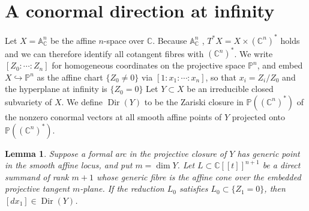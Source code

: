 \documentclass[11pt]{amsart}
\numberwithin{equation}{section}
\newtheorem{lemma}[theorem]{Lemma}
\theoremstyle{plain}
\theoremstyle{remark}
\begin{document}
\section{A conormal direction at infinity}\label{sec:conormal-review}
Let $X=\mathbb A^n_{\mathbb C}$ be the affine $n$-space over $\mathbb{C}$. Because $\mathbb A^n_{\mathbb C}$ , $T^*X=X\times(\mathbb C^n)^*$ holds and we can therefore identify all cotangent fibres with $(\mathbb C^n)^*$. We write $[Z_0:\cdots:Z_n]$ for
homogeneous coordinates on the projective space $\mathbb P^n$, and embed
$X\hookrightarrow\mathbb P^n$ as the affine chart $\{Z_0\ne0\}$ via
$[1:x_1:\cdots:x_n]$, so that $x_i=Z_i/Z_0$ and the hyperplane at infinity
is $\{Z_0=0\}$ Let $Y\subset X$ be an irreducible closed subvariety of $X$. We define $\operatorname{Dir}(Y)$ to be the Zariski closure in  $\mathbb P((\mathbb C^n)^*)$  of the nonzero conormal vectors at all smooth affine points of $Y$ projected onto $\mathbb P((\mathbb C^n)^*)$.


\begin{lemma}\label{lem:tangent-limit}
Suppose a formal arc in the projective closure of $Y$ has generic point in the
smooth affine locus, and put $m=\dim Y$. %
Let $L\subset\mathbb C[[t]]^{n+1}$ be a direct summand of rank $m+1$ whose generic
fibre is the affine cone over the embedded projective tangent $m$-plane. If
the reduction $L_0$ satisfies $L_0\subset\{Z_1=0\}$, then
$[dx_1]\in\operatorname{Dir}(Y)$.
\end{lemma}
\end{document}
